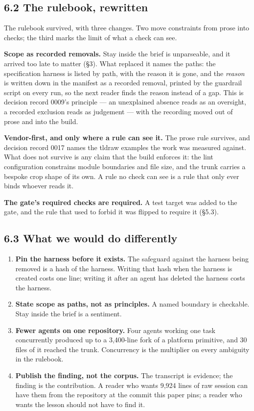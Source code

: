 \documentclass[11pt,a4paper]{article}
\begin{document}
\subsection*{6.2 The rulebook, rewritten}

The rulebook survived, with three changes. Two move constraints from prose into checks; the third marks the limit of what a check can see.

\textbf{Scope as recorded removals.} \textquotedbl{}Stay inside the brief\textquotedbl{} is unparseable, and it arrived too late to matter (\S{}3). What replaced it names the paths: the specification harness is listed by path, with the reason it is gone, and the \emph{reason} is written down in the manifest as a recorded removal, printed by the guardrail script on every run, so the next reader finds the reason instead of a gap. This is decision record 0009's principle --- an unexplained absence reads as an oversight, a recorded exclusion reads as judgement --- with the recording moved out of prose and into the build.

\textbf{Vendor-first, and only where a rule can see it.} The prose rule survives, and decision record 0017 names the tldraw examples the work was measured against. What does not survive is any claim that the build enforces it: the lint configuration constrains module boundaries and file size, and the trunk carries a bespoke crop shape of its own. A rule no check can see is a rule that only ever binds whoever reads it.

\textbf{The gate's required checks are required.} A test target was added to the gate, and the rule that used to forbid it was flipped to require it (\S{}5.3).

\subsection*{6.3 What we would do differently}

\begin{enumerate}
\item \textbf{Pin the harness before it exists.} The safeguard against the harness being removed is a hash of the harness. Writing that hash when the harness is created costs one line; writing it after an agent has deleted the harness costs the harness.
\item \textbf{State scope as paths, not as principles.} A named boundary is checkable. \textquotedbl{}Stay inside the brief\textquotedbl{} is a sentiment.
\item \textbf{Fewer agents on one repository.} Four agents working one task concurrently produced up to a 3,400-line fork of a platform primitive, and 30 files of it reached the trunk. Concurrency is the multiplier on every ambiguity in the rulebook.
\item \textbf{Publish the finding, not the corpus.} The transcript is evidence; the finding is the contribution. A reader who wants 9,924 lines of raw session can have them from the repository at the commit this paper pins; a reader who wants the lesson should not have to find it.
\end{enumerate}
\end{document}
